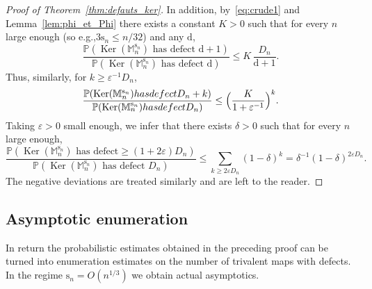 \documentclass[11pt]{article}
\newcommand{\eg}{e.g.,\xspace}
\theoremstyle{plain}
\theoremstyle{definition}
\theoremstyle{remark}
\renewcommand{\P}{\mathbb{P}}
\newcommand{\Mapb}{\mathbb{M}}
\newcommand{\defect}{\mathrm{d}}
\newcommand{\spar}{\mathrm{s}}
\DeclareMathOperator{\Ker}{Ker}
\begin{document}
\begin{proof}[Proof of Theorem~\ref{thm:defauts_ker}]
In addition, by~\eqref{eq:crude1} and Lemma~\ref{lem:phi_et_Phi} there exists a constant $K>0$ such that for every $n$ large enough (so \eg $3\spar_n \le n/32$) and any $\defect$,
\[
\frac{\P(\Ker(\Mapb_n^{\spar_n}) \textrm{ has defect } \defect+1)}{\P(\Ker(\Mapb_n^{\spar_n}) \textrm{ has defect } \defect)}
\le K\, \frac{D_n}{\defect+1}.
\]
Thus, similarly, for $k \ge \varepsilon^{-1} D_n$,
\[
\frac{\P(\Ker(\Mapb_n^{\spar_n}) \textrm{ has defect } D_n+k)}{\P(\Ker(\Mapb_n^{\spar_n}) \textrm{ has defect } D_n)}
\le \Bigl(\frac{K}{1+\varepsilon^{-1}}\Bigr)^k.
\]
Taking $\varepsilon>0$ small enough, we infer that there exists $\delta > 0$ such that for every $n$ large enough,
\[
\frac{\P(\Ker(\Mapb_n^{\spar_n}) \textrm{ has defect} \ge (1+2\varepsilon) D_n)}{\P(\Ker(\Mapb_n^{\spar_n}) \textrm{ has defect } D_n)}
\le \sum_{k \ge 2\varepsilon D_n} (1-\delta)^k = \delta^{-1} (1-\delta)^{2\varepsilon D_n}.
\]
The negative deviations are treated similarly and are left to the reader.
\end{proof}

\subsection{Asymptotic enumeration}
\label{ssec:asymp_enum}
In return the probabilistic estimates obtained in the preceding proof can be turned into enumeration estimates on the number of trivalent maps with defects. In the regime $\spar_{n} = O(n^{1/3})$ we obtain actual asymptotics.
\end{document}
